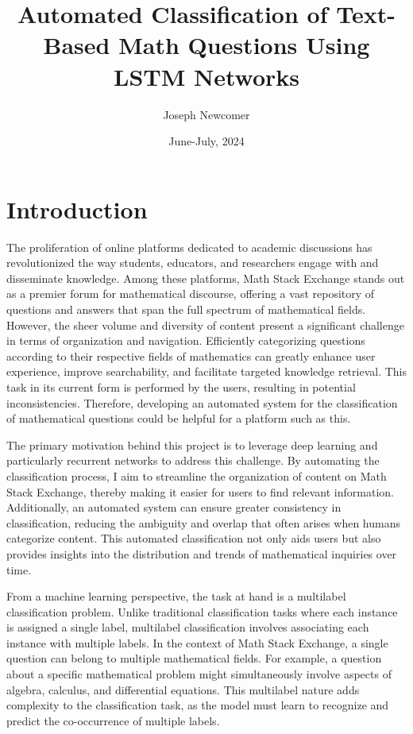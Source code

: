 \documentclass[12pt, letterpaper]{article}
\title{Automated Classification of Text-Based Math Questions Using LSTM Networks}
\author{Joseph Newcomer}
\date{June-July, 2024}
\begin{document}
\maketitle
\tableofcontents\newpage
\section{Introduction}
The proliferation of online platforms dedicated to academic discussions has revolutionized the way students, educators, and researchers engage with and disseminate knowledge. Among these platforms, Math Stack Exchange stands out as a premier forum for mathematical discourse, offering a vast repository of questions and answers that span the full spectrum of mathematical fields. However, the sheer volume and diversity of content present a significant challenge in terms of organization and navigation. Efficiently categorizing questions according to their respective fields of mathematics can greatly enhance user experience, improve searchability, and facilitate targeted knowledge retrieval. This task in its current form is performed by the users, resulting in potential inconsistencies. Therefore, developing an automated system for the classification of mathematical questions could be helpful for a platform such as this.
\par The primary motivation behind this project is to leverage deep learning and particularly recurrent networks to address this challenge. By automating the classification process, I aim to streamline the organization of content on Math Stack Exchange, thereby making it easier for users to find relevant information. Additionally, an automated system can ensure greater consistency in classification, reducing the ambiguity and overlap that often arises when humans categorize content. This automated classification not only aids users but also provides insights into the distribution and trends of mathematical inquiries over time.
\par From a machine learning perspective, the task at hand is a multilabel classification problem. Unlike traditional classification tasks where each instance is assigned a single label, multilabel classification involves associating each instance with multiple labels. In the context of Math Stack Exchange, a single question can belong to multiple mathematical fields. For example, a question about a specific mathematical problem might simultaneously involve aspects of algebra, calculus, and differential equations. This multilabel nature adds complexity to the classification task, as the model must learn to recognize and predict the co-occurrence of multiple labels.
\end{document}
